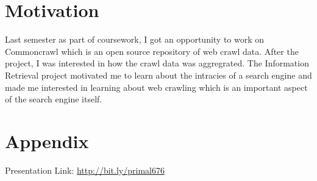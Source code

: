 \documentclass[a4paper, 11pt]{article} %
\begin{document}
\section*{Motivation}

Last semester as part of coursework, I got an opportunity to work on Commoncrawl \cite{commoncrawl2012} which is an open source repository of web crawl data. After the project, I was interested in how the crawl data was aggregrated. The Information Retrieval project motivated me to learn about the intracies of a search engine and made me interested in learning about web crawling which is an important aspect of the search engine itself.

\section*{Appendix}

Presentation Link: \url{http://bit.ly/primal676}







\end{document}
